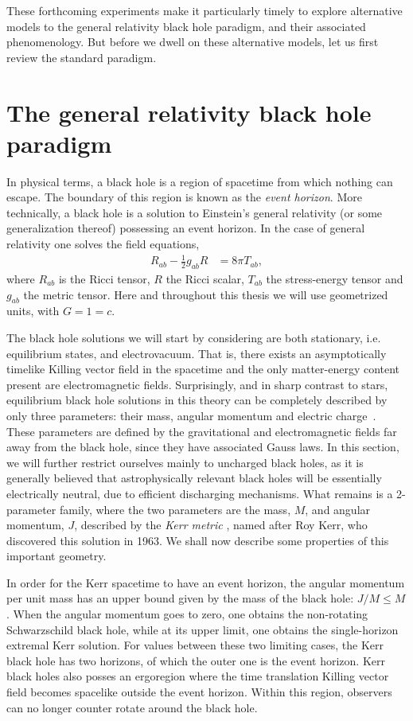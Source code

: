 These forthcoming experiments make it particularly timely to explore alternative models to the general relativity black hole paradigm, and their associated phenomenology.
But before we dwell on these alternative models, let us first review the standard paradigm.
\section{The general relativity black hole paradigm}
\label{sec:bh_gr}

In physical terms, a black hole is a region of spacetime from which nothing can escape.
The boundary of this region is known as the \textit{event horizon}.
More technically, a black hole is a solution to Einstein's general relativity (or some generalization thereof) possessing an event horizon.
In the case of general relativity one solves the field equations,
\begin{align}
  R_{ab} - \frac{1}{2}g_{ab}R  &= 8\pi T_{ab},
  \label{eqn:Einstein-eqns}
\end{align}
where $R_{ab}$ is the Ricci tensor, $R$ the Ricci scalar, $T_{ab}$ the stress-energy tensor and $g_{ab}$ the metric tensor.
Here and throughout this thesis we will use geometrized units, with $G=1=c$.

The black hole solutions we will start by considering are both stationary, i.e. equilibrium states, and electrovacuum.
That is, there exists an asymptotically timelike Killing vector field in the spacetime and the only matter-energy content present are electromagnetic fields.
Surprisingly, and in sharp contrast to stars, equilibrium black hole solutions in this theory can be completely described by only three parameters: their mass, angular momentum and electric charge~\cite{Chrusciel:2012jk}.
These parameters are defined by the gravitational and electromagnetic fields far away from the black hole, since they have associated Gauss laws.
In this section, we will further restrict ourselves mainly to uncharged black holes, as it is generally believed that astrophysically relevant black holes will be essentially electrically neutral, due to efficient discharging mechanisms.
What remains is a 2-parameter family, where the two parameters are the mass, $M$, and angular momentum, $J$, described by the \textit{Kerr metric} \cite{Kerr:1963ud}, named after Roy Kerr, who discovered this solution in 1963.
We shall now describe some properties of this important geometry.

In order for the Kerr spacetime to have an event horizon, the angular momentum per unit mass has an upper bound given by the mass of the black hole: $J/M\le M$.
When the angular momentum goes to zero, one obtains the non-rotating Schwarzschild black hole, while at its upper limit, one obtains the single-horizon extremal Kerr solution.
For values between these two limiting cases, the Kerr black hole has two horizons, of which the outer one is the event horizon.
Kerr black holes also posses an ergoregion where the time translation Killing vector field becomes spacelike outside the event horizon.
Within this region, observers can no longer counter rotate around the black hole.

